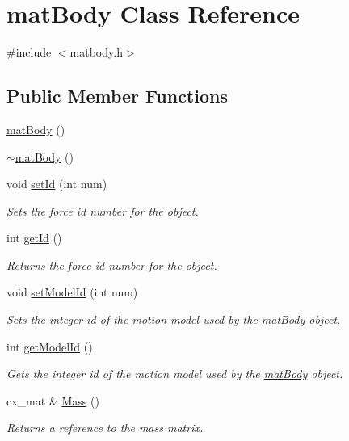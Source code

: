 \hypertarget{classmat_body}{\section{mat\-Body Class Reference}
\label{classmat_body}
}


{\ttfamily \#include $<$matbody.\-h$>$}

\subsection*{Public Member Functions}
\begin{DoxyCompactItemize}
\item 
\hyperlink{classmat_body_adbcb73fc9873660ca781493b2b2742a2}{mat\-Body} ()
\item 
\hyperlink{classmat_body_afcc3a6a87689dfbb5dfa72648a46c355}{$\sim$mat\-Body} ()
\item 
void \hyperlink{classmat_body_abb86318fbd7300ed01eae308551f9e96}{set\-Id} (int num)
\begin{DoxyCompactList}\small\item\em Sets the force id number for the object. \end{DoxyCompactList}\item 
int \hyperlink{classmat_body_a551183ad56eeba71ea4690574b1841e4}{get\-Id} ()
\begin{DoxyCompactList}\small\item\em Returns the force id number for the object. \end{DoxyCompactList}\item 
void \hyperlink{classmat_body_abb8ea32c84153da5dfc53d7b0dc836a5}{set\-Model\-Id} (int num)
\begin{DoxyCompactList}\small\item\em Sets the integer id of the motion model used by the \hyperlink{classmat_body}{mat\-Body} object. \end{DoxyCompactList}\item 
int \hyperlink{classmat_body_ae4c339b7ce6a93cf6e54bc998cbd5903}{get\-Model\-Id} ()
\begin{DoxyCompactList}\small\item\em Gets the integer id of the motion model used by the \hyperlink{classmat_body}{mat\-Body} object. \end{DoxyCompactList}\item 
cx\-\_\-mat \& \hyperlink{classmat_body_ad1f7a689d28f2201cf9455495536fa8b}{Mass} ()
\begin{DoxyCompactList}\small\item\em Returns a reference to the mass matrix. \end{DoxyCompactList}\item 

\end{DoxyCompactItemize}
